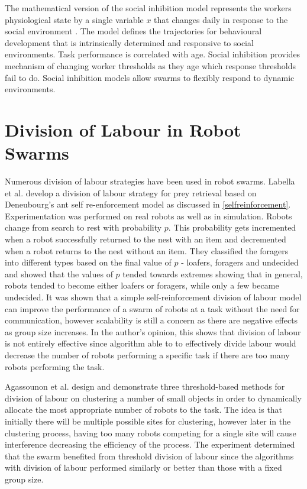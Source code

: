 The mathematical version of the social inhibition model represents the workers physiological state by a single variable $x$ that changes daily in response to the social environment \cite{beshers2001social}. The model defines the trajectories for behavioural development that is intrinsically determined and responsive to social environments. Task performance is correlated with age. Social inhibition provides mechanism of changing worker thresholds as they age which response thresholds fail to do. Social inhibition models allow swarms to flexibly respond to dynamic environments. %

\section{Division of Labour in Robot Swarms}

Numerous division of labour strategies have been used in robot swarms. Labella et al. \cite{labella2006division} develop a division of labour strategy for prey retrieval based on Deneubourg's ant self re-enforcement model as discussed in \ref{selfreinforcement}. Experimentation was performed on real robots as well as in simulation. Robots change from search to rest with probability $p$. This probability gets incremented when a robot successfully returned to the nest with an item and decremented when a robot returns to the nest without an item. They classified the foragers into different types based on the final value of $p$ - loafers, foragers and undecided and showed that the values of $p$ tended towards extremes showing that in general, robots tended to become either loafers or foragers, while only a few became undecided. It was shown that a simple self-reinforcement division of labour model can improve the performance of a swarm of robots at a task without the need for communication, however scalability is still a concern as there are negative effects as group size increases. In the author's opinion, this shows that division of labour is not entirely effective since algorithm able to to effectively divide labour would decrease the number of robots performing a specific task if there are too many robots performing the task.

Agassounon et al. design and demonstrate three threshold-based methods for division of labour\cite{agassounon2002efficiency} on clustering a number of small objects in order to dynamically allocate the most appropriate number of robots to the task. The idea is that initially there will be multiple possible sites for clustering, however later in the clustering process, having too many robots competing for a single site will cause interference decreasing the efficiency of the process. The experiment determined that the swarm benefited from threshold division of labour since the algorithms with division of labour performed similarly or better than those with a fixed group size. 


